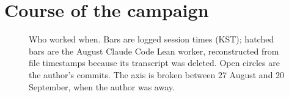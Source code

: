 \documentclass[11pt,a4paper]{article}
\begin{document}
\section{Course of the campaign}\label{sec:course}

\begin{figure}[t]
\centering
\resizebox{\linewidth}{!}{}
\caption{Who worked when. Bars are logged session times (KST); hatched bars are the August Claude Code Lean
worker, reconstructed from file timestamps because its transcript was deleted. Open circles are the author's
commits. The axis is broken between 27 August and 20 September, when the author was away.}
\label{fig:timeline}
\end{figure}
\end{document}
